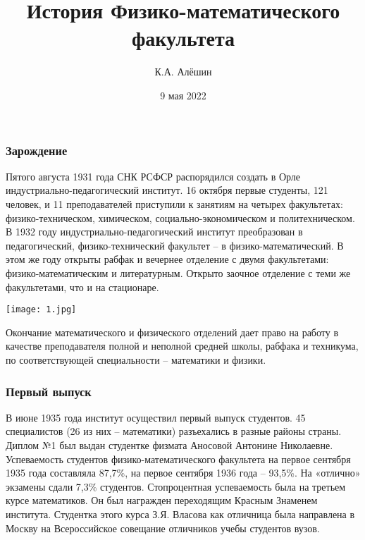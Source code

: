 \documentclass[pdf,hyperref={unicode}, aspectratio=43, serif,11pt]{beamer}
\title[Презентация 11ПИФМ]{История Физико-математического факультета}
\author{К.А. Алёшин}
\date{9 мая 2022}
\institute[]{Орловский государственный
университет имени И.\,С.~Тургенева}
\begin{document}
\begin{frame}
\titlepage
\end{frame}


\begin{frame}
	\frametitle{Зарождение}
	Пятого августа 1931 года СНК РСФСР распорядился создать в Орле индустриально-педагогический институт. 16 октября первые студенты, 121 человек, и 11 преподавателей приступили к занятиям на четырех факультетах: физико-техническом, химическом, социально-экономическом и политехническом.\\
	 В 1932 году индустриально-педагогический институт преобразован в педагогический, физико-технический факультет – в физико-математический. В этом же году открыты рабфак и вечернее отделение с двумя факультетами: физико-математическим и литературным. Открыто заочное отделение с теми же факультетами, что и на стационаре.

\end{frame}
\begin{frame}
	\begin{center}
	\texttt{[image: 1.jpg]}
	\end{center}
Окончание математического и физического отделений дает право на работу в качестве преподавателя полной и неполной средней школы, рабфака и техникума, по соответствующей специальности – математики и физики.
\end{frame}
\begin{frame}
	\frametitle{Первый выпуск}
В июне 1935 года институт осуществил первый выпуск студентов. 45 специалистов (26 из них – математики) разъехались в разные районы страны. Диплом №1 был выдан студентке физмата Аносовой Антонине Николаевне.\\
Успеваемость студентов физико-математического факультета на первое сентября 1935 года составляла 87,7\%, на первое сентября 1936 года – 93,5\%. На «отлично» экзамены сдали 7,3\% студентов. Стопроцентная успеваемость была на третьем курсе математиков. Он был награжден переходящим Красным Знаменем института. Студентка этого курса З.Я. Власова как отличница была направлена в Москву на Всероссийское совещание отличников учебы студентов вузов.
\end{frame}
\end{document}
